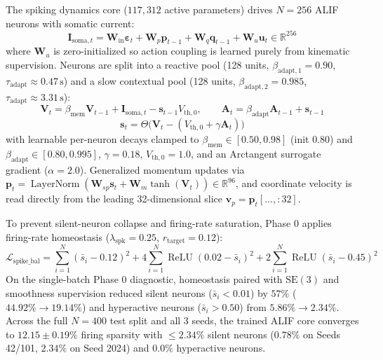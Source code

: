 \documentclass[11pt]{article}
\begin{document}
The spiking dynamics core ($117{,}312$ active parameters) drives $N = 256$ ALIF neurons with somatic current:
\[
\mathbf{I}_{\text{soma}, t} = \mathbf{W}_{\text{in}}\boldsymbol{\varepsilon}_t + \mathbf{W}_p\mathbf{p}_{t-1} + \mathbf{W}_q\mathbf{q}_{t-1} + \mathbf{W}_u\mathbf{u}_t \in \mathbb{R}^{256}
\]
where $\mathbf{W}_u$ is zero-initialized so action coupling is learned purely from kinematic supervision. Neurons are split into a reactive pool (128 units, $\beta_{\text{adapt},1} = 0.90$, $\tau_{\text{adapt}} \approx 0.47\,\text{s}$) and a slow contextual pool (128 units, $\beta_{\text{adapt},2} = 0.985$, $\tau_{\text{adapt}} \approx 3.31\,\text{s}$):
\[
\mathbf{V}_t = \beta_{\text{mem}}\mathbf{V}_{t-1} + \mathbf{I}_{\text{soma}, t} - \mathbf{s}_{t-1}V_{\text{th},0}, \qquad \mathbf{A}_t = \beta_{\text{adapt}}\mathbf{A}_{t-1} + \mathbf{s}_{t-1}
\]
\[
\mathbf{s}_t = \Theta\!\big(\mathbf{V}_t - (V_{\text{th},0} + \gamma\mathbf{A}_t)\big)
\]
with learnable per-neuron decays clamped to $\beta_{\text{mem}} \in [0.50, 0.98]$ (init $0.80$) and $\beta_{\text{adapt}} \in [0.80, 0.995]$, $\gamma = 0.18$, $V_{\text{th},0} = 1.0$, and an Arctangent surrogate gradient ($\alpha = 2.0$). Generalized momentum updates via $\mathbf{p}_t = \operatorname{LayerNorm}(\mathbf{W}_{sp}\mathbf{s}_t + \mathbf{W}_m\tanh(\mathbf{V}_t)) \in \mathbb{R}^{96}$, and coordinate velocity is read directly from the leading 32-dimensional slice $\mathbf{v}_p = \mathbf{p}_t[\dots, :32]$.

To prevent silent-neuron collapse and firing-rate saturation, Phase 0 applies firing-rate homeostasis ($\lambda_{\text{spk}} = 0.25$, $r_{\text{target}} = 0.12$):
\[
\mathcal{L}_{\text{spike\_bal}} = \sum_{i=1}^{N}(\bar{s}_i - 0.12)^2 + 4\sum_{i=1}^{N}\operatorname{ReLU}(0.02 - \bar{s}_i)^2 + 2\sum_{i=1}^{N}\operatorname{ReLU}(\bar{s}_i - 0.45)^2
\]
On the single-batch Phase 0 diagnostic, homeostasis paired with $\text{SE}(3)$ and smoothness supervision reduced silent neurons ($\bar{s}_i < 0.01$) by $57\%$ ($44.92\% \to 19.14\%$) and hyperactive neurons ($\bar{s}_i > 0.50$) from $5.86\% \to 2.34\%$. Across the full $N=400$ test split and all 3 seeds, the trained ALIF core converges to $12.15 \pm 0.19\%$ firing sparsity with $\le 2.34\%$ silent neurons ($0.78\%$ on Seeds 42/101, $2.34\%$ on Seed 2024) and $0.0\%$ hyperactive neurons.
\end{document}

